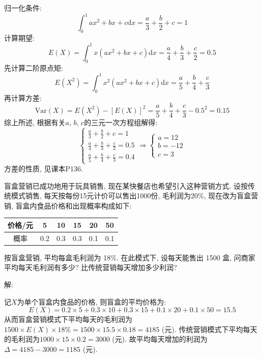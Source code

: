 \documentclass[standard]{ExBook}
\renewenvironment{shaded}{%
  \def\FrameCommand{\fboxsep=\FrameSep \colorbox{shadecolor}}%
  \MakeFramed{\advance\hsize-\width \FrameRestore}%
}{%
  \endMakeFramed
}
\begin{document}
\begin{qitems}
归一化条件:
$$\int_{0}^{1}ax^2+bx+c\mathrm{d}x=\frac{a}{3}+\frac{b}{2}+c=1$$
计算期望:
$$E(X)=\int_{0}^{1}x(ax^2+bx+c)\mathrm{d}x=\frac{a}{4}+\frac{b}{3}+\frac{c}{2}=0.5$$
先计算二阶原点矩:
$$E(X^2)=\int_{0}^{1}x^2(ax^2+bx+c)\mathrm{d}x=\frac{a}{5}+\frac{b}{4}+\frac{c}{3}$$
再计算方差:
$$\mathrm{Var}(X)=E(X^2)-\left[E(X)\right]^2=\frac{a}{5}+\frac{b}{4}+\frac{c}{3}-0.5^2=0.15$$
综上所述, 根据有关$a$, $b$, $c$的三元一次方程组解得:
$$
    \left\{
\begin{array}{l}
    \frac{a}{3}+\frac{b}{2}+c=1\\
    \frac{a}{4}+\frac{b}{3}+\frac{c}{2}=0.5\\
    \frac{a}{5}+\frac{b}{4}+\frac{c}{3}=0.4
\end{array}
    \right.
    \Longrightarrow
    \left\{
\begin{array}{l}
    a=12\\
    b=-12\\
    c=3
\end{array}
    \right.
$$
\textcolor{themeColor}{\selectfont {}
方差的性质, 见课本P136.}

\vspace{2.5cm-5em}

    \begin{bbox}
    \begin{shaded}
        \qitem
盲盒营销已成功地用于玩具销售, 现在某快餐店也希望引入这种营销方式. 设按传统模式销售, 每天按每份15元计价可以售出1000份, 毛利润为20\%, 现在改为盲盒营销, 盲盒内食品价格和出现概率构成如下:
\begin{center}
\setlength{\tabcolsep}{30pt}
\begin{tabular}{c|ccccc}
    \hline
    价格/元 & 5 & 10 & 15 & 20 & 50\\
    \hline
    概率 & 0.2 & 0.3 & 0.3 & 0.1 & 0.1\\
    \hline
\end{tabular}
\end{center}
按盲盒营销, 平均每盒毛利润为 18\%. 在此模式下, 设每天能售出 1500 盒, 问商家平均每天毛利润有多少? 比传统营销每天增加多少利润?
    \end{shaded}
    \end{bbox}

\vspace{\dimexpr2.5cm-5em\relax}

解: 

记$X$为单个盲盒内食品的价格, 则盲盒的平均价格为:
$$E(X)=0.2\times5+0.3\times10+0.3\times15+0.1\times20+0.1\times50=15.5$$
从而盲盒营销模式下平均每天的毛利润为$1500\times E(X)\times18\%=1500\times15.5\times0.18=4185$ (元). 传统营销模式下平均每天的毛利润为$1000\times15\times0.2=3000$ (元). 故平均每天增加的利润为$\Delta=4185-3000=1185$ (元).


\end{qitems}
\end{document}
